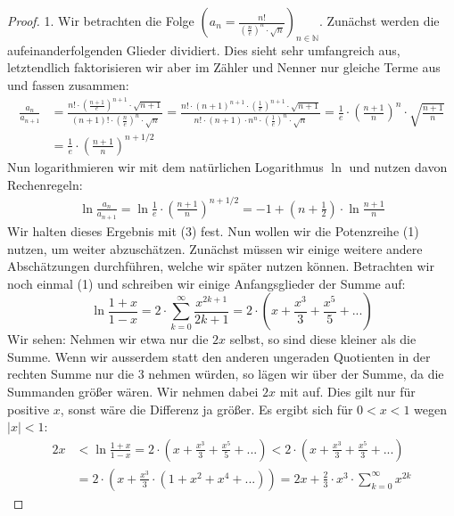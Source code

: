 \documentclass[10pt,fleqn]{article}
\theoremstyle{definition}
\theoremstyle{remark}
\begin{document}
\begin{proof}
    1. Wir betrachten die Folge \(\left(a_n = \frac{n!}{\left(\frac{n}{e}\right)^n\cdot\sqrt{n}}\right)_{n\in\mathbb{N}}\). Zunächst werden die aufeinanderfolgenden Glieder dividiert. Dies sieht sehr umfangreich aus, letztendlich faktorisieren wir aber im Zähler und Nenner nur gleiche Terme aus und fassen zusammen: 
    \begin{align*}
        \frac{a_n}{a_{n+1}} &= \frac{n! \cdot \left(\frac{n+1}{e}\right)^{n+1}\cdot\sqrt{n+1}}{(n+1)! \cdot \left(\frac{n}{e}\right)^{n}\cdot\sqrt{n}} = \frac{n! \cdot (n+1)^{n+1} \cdot \left(\frac{1}{e}\right)^{n+1} \cdot \sqrt{n+1}}{n! \cdot (n+1) \cdot n^n \cdot \left(\frac{1}{e}\right)^n \cdot \sqrt{n}} = \frac{1}{e} \cdot \left(\frac{n+1}{n}\right)^n \cdot \sqrt{\frac{n+1}{n}}\\
        &= \frac{1}{e} \cdot \left(\frac{n+1}{n}\right)^{n+1/2}
    \end{align*}
    Nun logarithmieren wir mit dem natürlichen Logarithmus \(\ln\) und nutzen davon Rechenregeln:
    \begin{align}
        \ln{\frac{a_n}{a_{n+1}}} = \ln{\frac{1}{e} \cdot \left(\frac{n+1}{n}\right)^{n+1/2}} = -1 + \left(n + \frac{1}{2}\right) \cdot \ln{\frac{n+1}{n}}
    \end{align}
    Wir halten dieses Ergebnis mit (3) fest. Nun wollen wir die Potenzreihe (1) nutzen, um weiter abzuschätzen. Zunächst müssen wir einige weitere andere Abschätzungen durchführen, welche wir später nutzen können. Betrachten wir noch einmal (1) und schreiben wir einige Anfangsglieder der Summe auf:
    \[
        \ln{\frac{1+x}{1-x}} = 2 \cdot \sum_{k=0}^{\infty} \frac{x^{2k+1}}{2k+1} = 2 \cdot \left(x + \frac{x^3}{3} + \frac{x^5}{5} + ...\right)
    \]
    Wir sehen: Nehmen wir etwa nur die \(2x\) selbst, so sind diese kleiner als die Summe. Wenn wir ausserdem statt den anderen ungeraden Quotienten in der rechten Summe nur die \(3\) nehmen würden, so lägen wir über der Summe, da die Summanden größer wären. Wir nehmen dabei \(2x\) mit auf. Dies gilt nur für positive \(x\), sonst wäre die Differenz ja größer. Es ergibt sich für \(0 < x < 1\) wegen \(|x| < 1\):
    \begin{align*}
        2x &< \ln{\frac{1+x}{1-x}} = 2 \cdot \left(x + \frac{x^3}{3} + \frac{x^5}{5} + ...\right) < 2 \cdot \left(x + \frac{x^3}{3} + \frac{x^5}{3} + ...\right)\\
        &= 2 \cdot \left(x + \frac{x^3}{3} \cdot (1 + x^2 + x^4 + ...) \right) = 2 x + \frac{2}{3} \cdot x^3 \cdot \sum_{k=0}^{\infty} x^{2k}

\end{align*}
\end{proof}
\end{document}
